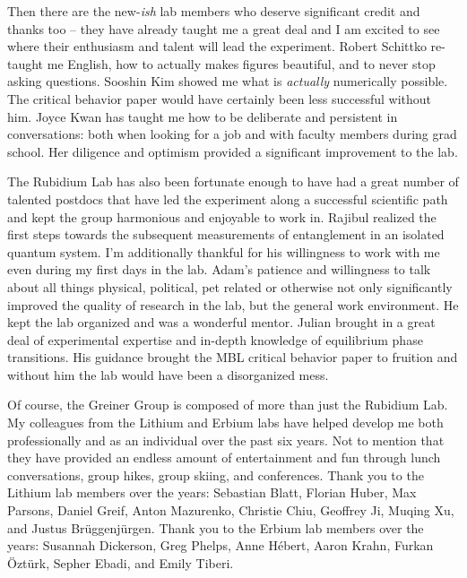 Then there are the new-\emph{ish} lab members who deserve significant credit and thanks too -- they have already taught me a great deal and I am excited to see where their enthusiasm and talent will lead the experiment. Robert Schittko re-taught me English, how to actually makes figures beautiful, and to never stop asking questions. Sooshin Kim showed me what is \emph{actually} numerically possible. The critical behavior paper would have certainly been less successful without him. Joyce Kwan has taught me how to be deliberate and persistent in conversations: both when looking for a job and with faculty members during grad school. Her diligence and optimism provided a significant improvement to the lab.

The Rubidium Lab has also been fortunate enough to have had a great number of talented postdocs that have led the experiment along a successful scientific path and kept the group harmonious and enjoyable to work in. Rajibul realized the first steps towards the subsequent measurements of entanglement in an isolated quantum system. I'm additionally thankful for his willingness to work with me even during my first days in the lab. Adam's patience and willingness to talk about all things physical, political, pet related or otherwise not only significantly improved the quality of research in the lab, but the general work environment. He kept the lab organized and was a wonderful mentor. Julian brought in a great deal of experimental expertise and in-depth knowledge of equilibrium phase transitions. His guidance brought the MBL critical behavior paper to fruition and without him the lab would have been a disorganized mess.

Of course, the Greiner Group is composed of more than just the Rubidium Lab. My colleagues from the Lithium and Erbium labs have helped develop me both professionally and as an individual over the past six years. Not to mention that they have provided an endless amount of entertainment and fun through lunch conversations, group hikes, group skiing, and conferences. Thank you to the Lithium lab members over the years: Sebastian Blatt, Florian Huber, Max Parsons, Daniel Greif, Anton Mazurenko, Christie Chiu, Geoffrey Ji, Muqing Xu, and Justus Br\"uggenj\"urgen. Thank you to the Erbium lab members over the years: Susannah Dickerson, Greg Phelps, Anne H\'ebert, Aaron Krahn, Furkan \"Ozt\"urk, Sepher Ebadi, and Emily Tiberi.

